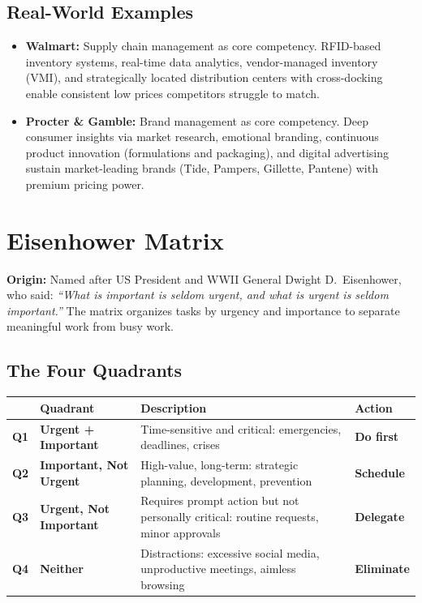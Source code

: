 \documentclass[11pt, letterpaper]{article}
\begin{document}
\subsection{Real-World Examples}

\begin{itemize}[leftmargin=*]
  \item \textbf{Walmart:} Supply chain management as core competency. RFID-based inventory systems, real-time data analytics, vendor-managed inventory (VMI), and strategically located distribution centers with cross-docking enable consistent low prices competitors struggle to match.
  \item \textbf{Procter \& Gamble:} Brand management as core competency. Deep consumer insights via market research, emotional branding, continuous product innovation (formulations and packaging), and digital advertising sustain market-leading brands (Tide, Pampers, Gillette, Pantene) with premium pricing power.
\end{itemize}

\newpage

\section{Eisenhower Matrix}

\begin{defbox}
\textbf{Origin:} Named after US President and WWII General Dwight D.\ Eisenhower, who said: \textit{``What is important is seldom urgent, and what is urgent is seldom important.''} The matrix organizes tasks by urgency and importance to separate meaningful work from busy work.
\end{defbox}

\subsection{The Four Quadrants}

\begin{center}
\begin{tabular}{p{1.5cm} >{\bfseries}p{3.5cm} p{4cm} p{4cm}}
\toprule
 & Quadrant & Description & Action \\
\midrule
\textbf{Q1} & Urgent + Important & Time-sensitive and critical: emergencies, deadlines, crises & \textbf{Do first} \\
\addlinespace
\textbf{Q2} & Important, Not Urgent & High-value, long-term: strategic planning, development, prevention & \textbf{Schedule} \\
\addlinespace
\textbf{Q3} & Urgent, Not Important & Requires prompt action but not personally critical: routine requests, minor approvals & \textbf{Delegate} \\
\addlinespace
\textbf{Q4} & Neither & Distractions: excessive social media, unproductive meetings, aimless browsing & \textbf{Eliminate} \\
\bottomrule
\end{tabular}
\end{center}
\end{document}
